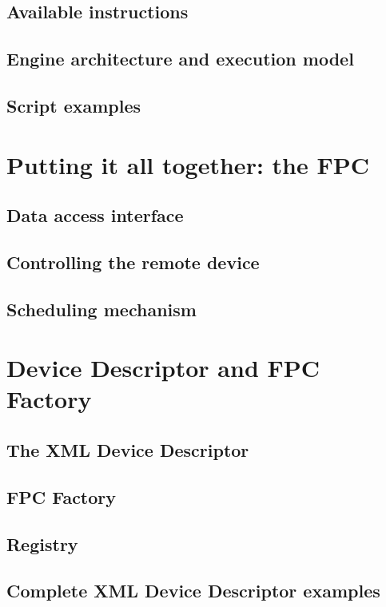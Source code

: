\subsection{Available instructions}

\subsection{Engine architecture and execution model}

\subsection{Script examples}


\section{Putting it all together: the FPC}

\subsection{Data access interface}

\subsection{Controlling the remote device}

\subsection{Scheduling mechanism}


\section{Device Descriptor and FPC Factory}

\subsection{The XML Device Descriptor}

\subsection{FPC Factory}

\subsection{Registry}

\subsection{Complete XML Device Descriptor examples}